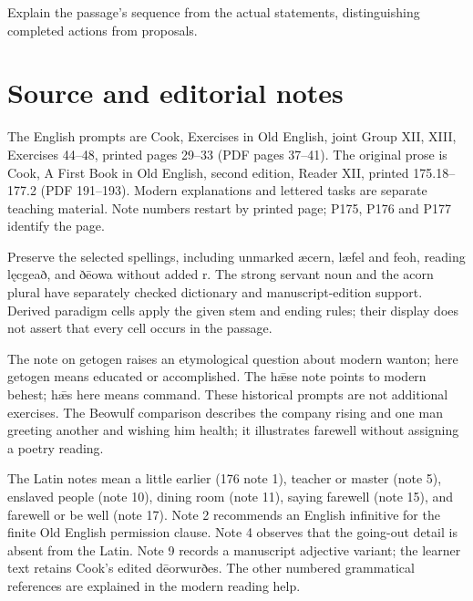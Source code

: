 Explain the passage’s sequence from the actual statements, distinguishing completed actions from proposals.



\section*{Source and editorial notes}

\begingroup\fontsize{10}{12.8}\selectfont
\setlength{\parskip}{1.5pt}
The English prompts are Cook, Exercises in Old English, joint Group XII, XIII, Exercises 44–48, printed pages 29–33 (PDF pages 37–41). The original prose is Cook, A First Book in Old English, second edition, Reader XII, printed 175.18–177.2 (PDF 191–193). Modern explanations and lettered tasks are separate teaching material. Note numbers restart by printed page; P175, P176 and P177 identify the page.

Preserve the selected spellings, including unmarked æcern, læfel and feoh, reading lęcgeað, and ðēowa without added r. The strong servant noun and the acorn plural have separately checked dictionary and manuscript-edition support. Derived paradigm cells apply the given stem and ending rules; their display does not assert that every cell occurs in the passage.

The note on getogen raises an etymological question about modern wanton; here getogen means educated or accomplished. The hǣse note points to modern behest; hǣs here means command. These historical prompts are not additional exercises. The Beowulf comparison describes the company rising and one man greeting another and wishing him health; it illustrates farewell without assigning a poetry reading.

The Latin notes mean a little earlier (176 note 1), teacher or master (note 5), enslaved people (note 10), dining room (note 11), saying farewell (note 15), and farewell or be well (note 17). Note 2 recommends an English infinitive for the finite Old English permission clause. Note 4 observes that the going-out detail is absent from the Latin. Note 9 records a manuscript adjective variant; the learner text retains Cook’s edited dēorwurðes. The other numbered grammatical references are explained in the modern reading help.


